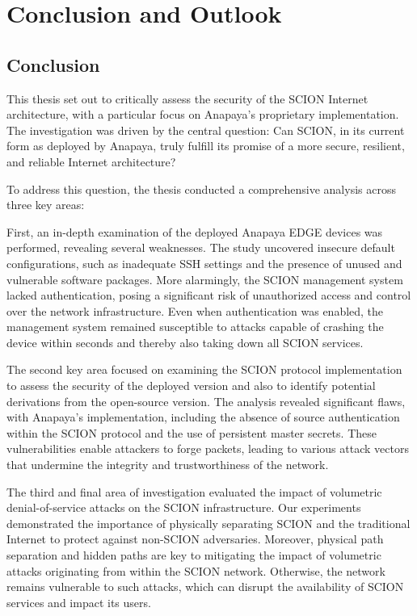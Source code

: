 \chapter{Conclusion and Outlook}
\label{ch:conclusion}



\section{Conclusion}

This thesis set out to critically assess the security of the SCION Internet architecture, with a particular focus on Anapaya's proprietary implementation.
The investigation was driven by the central question:
Can SCION, in its current form as deployed by Anapaya, truly fulfill its promise of a more secure, resilient, and reliable Internet architecture?

To address this question, the thesis conducted a comprehensive analysis across three key areas:

First, an in-depth examination of the deployed Anapaya EDGE devices was performed, revealing several weaknesses.
The study uncovered insecure default configurations, such as inadequate SSH settings and the presence of unused and vulnerable software packages.
More alarmingly, the SCION management system lacked authentication, posing a significant risk of unauthorized access and control over the network infrastructure.
Even when authentication was enabled, the management system remained susceptible to attacks capable of crashing the device within seconds and thereby also taking down all SCION services.


The second key area focused on examining the SCION protocol implementation to assess the security of the deployed version and also to identify potential derivations from the open-source version.
The analysis revealed significant flaws, with Anapaya's implementation, including the absence of source authentication within the SCION protocol and the use of persistent master secrets.
These vulnerabilities enable attackers to forge packets, leading to various attack vectors that undermine the integrity and trustworthiness of the network.


The third and final area of investigation evaluated the impact of volumetric denial-of-service attacks on the SCION infrastructure.
Our experiments demonstrated the importance of physically separating SCION and the traditional Internet to protect against non-SCION adversaries.
Moreover, physical path separation and hidden paths are key to mitigating the impact of volumetric attacks originating from within the SCION network.
Otherwise, the network remains vulnerable to such attacks, which can disrupt the availability of SCION services and impact its users.

